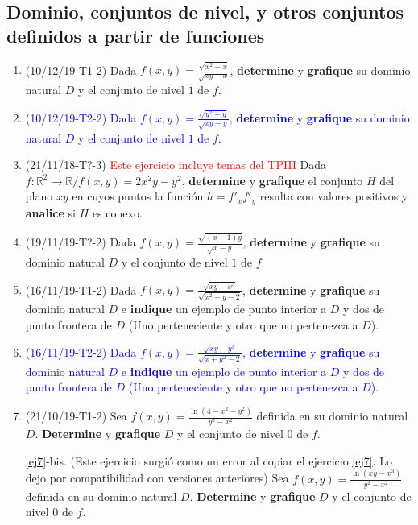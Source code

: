 \documentclass[12pt,a4paper]{article}
\renewcommand{\b}[1]{\textbf{#1}}
\newcommand{\red}[1]{\textcolor{red}{#1}}
\newcommand{\blue}[1]{\textcolor{blue}{#1}}
\begin{document}
\subsection{Dominio, conjuntos de nivel, y otros conjuntos definidos a partir de funciones}\label{dominio}
\begin{enumerate}
	\item (10/12/19-T1-2) Dada $f(x, y)=\frac{\sqrt{x^2-x}}{\sqrt{xy-x}}$, \textbf{determine} y \textbf{grafique} su dominio natural $D$ y el conjunto de nivel $1$ de $f$.
	
	\item \blue{(10/12/19-T2-2) Dada $f(x, y)=\frac{\sqrt{y^2-y}}{\sqrt{xy-y}}$, \textbf{determine} y \textbf{grafique} su dominio natural $D$ y el conjunto de nivel $1$ de $f$.}
	
	\item (21/11/18-T?-3) \red{Este ejercicio incluye temas del TPIII} Dada $f: \mathbb{R}^2\rightarrow\mathbb{R}/ f(x, y)=2x^2y-y^2$, \textbf{determine} y \textbf{grafique} el conjunto $H$ del plano $xy$ en cuyos puntos la función $h=f'_x f'_y$ resulta con valores positivos y \textbf{analice} si $H$ es conexo. \label{ej:parciales3}
	
	\item (19/11/19-T?-2) Dada $f(x, y)=\frac{\sqrt{(x-1)y}}{\sqrt{x-y}}$, \textbf{determine} y \textbf{grafique} su dominio natural $D$ y el conjunto de nivel $1$ de $f$.	

	\item (16/11/19-T1-2) Dada $f(x, y)=\frac{\sqrt{xy-x^3}}{\sqrt{x^2+y-2}}$, \textbf{determine} y \textbf{grafique} su dominio natural $D$ e \b{indique} un ejemplo de punto interior a $D$ y dos de punto frontera de $D$ (Uno perteneciente y otro que no pertenezca a $D$).

	\item \blue{(16/11/19-T2-2) Dada $f(x, y)=\frac{\sqrt{xy-y^3}}{\sqrt{x+y^2-2}}$, \textbf{determine} y \textbf{grafique} su dominio natural $D$ e \b{indique} un ejemplo de punto interior a $D$ y dos de punto frontera de $D$ (Uno perteneciente y otro que no pertenezca a $D$).}
	
	\item (21/10/19-T1-2) Sea $f(x, y)=\frac{\ln{(4-x^2-y^2)}}{y^2-x^2}$ definida en su dominio natural $D$. \textbf{Determine} y \textbf{grafique} $D$ y el conjunto de nivel $0$ de $f$. \label{ej7}
	
	\item[\ref{ej7}-bis.] (Este ejercicio surgió como un error al copiar el ejercicio \ref{ej7}. Lo dejo por compatibilidad con versiones anteriores) Sea $f(x, y)=\frac{\ln{(xy-x^3)}}{y^2-x^2}$ definida en su dominio natural $D$. \textbf{Determine} y \textbf{grafique} $D$ y el conjunto de nivel $0$ de $f$.
	

\end{enumerate}
\end{document}
